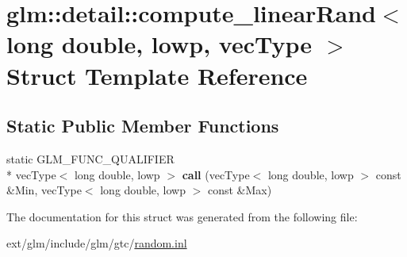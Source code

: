\hypertarget{structglm_1_1detail_1_1compute__linear_rand_3_01long_01double_00_01lowp_00_01vec_type_01_4}{\section{glm\-:\-:detail\-:\-:compute\-\_\-linear\-Rand$<$ long double, lowp, vec\-Type $>$ Struct Template Reference}
\label{structglm_1_1detail_1_1compute__linear_rand_3_01long_01double_00_01lowp_00_01vec_type_01_4}
}
\subsection*{Static Public Member Functions}
\begin{DoxyCompactItemize}
\item 
\hypertarget{structglm_1_1detail_1_1compute__linear_rand_3_01long_01double_00_01lowp_00_01vec_type_01_4_a946041e54f74d77bc7ca81ae69eaaffc}{static G\-L\-M\-\_\-\-F\-U\-N\-C\-\_\-\-Q\-U\-A\-L\-I\-F\-I\-E\-R \\*
vec\-Type$<$ long double, lowp $>$ {\bfseries call} (vec\-Type$<$ long double, lowp $>$ const \&Min, vec\-Type$<$ long double, lowp $>$ const \&Max)}\label{structglm_1_1detail_1_1compute__linear_rand_3_01long_01double_00_01lowp_00_01vec_type_01_4_a946041e54f74d77bc7ca81ae69eaaffc}

\end{DoxyCompactItemize}


The documentation for this struct was generated from the following file\-:\begin{DoxyCompactItemize}
\item 
ext/glm/include/glm/gtc/\hyperlink{random_8inl}{random.\-inl}\end{DoxyCompactItemize}
